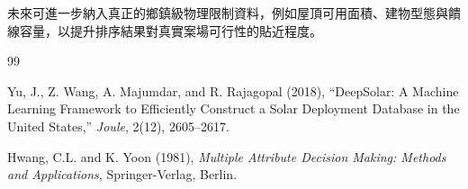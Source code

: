 \documentclass[12pt, a4paper]{article}
\begin{document}
未來可進一步納入真正的鄉鎮級物理限制資料，例如屋頂可用面積、建物型態與饋線容量，以提升排序結果對真實案場可行性的貼近程度。

\begin{thebibliography}{99}

Yu, J., Z. Wang, A. Majumdar, and R. Rajagopal (2018), ``DeepSolar: A Machine Learning Framework to Efficiently Construct a Solar Deployment Database in the United States,'' \textit{Joule}, 2(12), 2605--2617.

Hwang, C.L. and K. Yoon (1981), \textit{Multiple Attribute Decision Making: Methods and Applications}, Springer-Verlag, Berlin.

\end{thebibliography}
\end{document}
